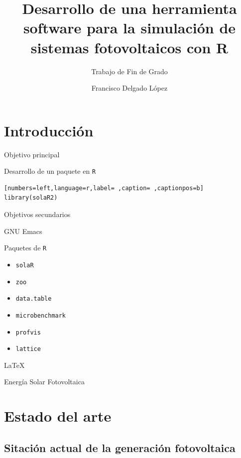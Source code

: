 \documentclass[aspectratio=169, usenames,svgnames,dvipsnames]{beamer}
\author{Francisco Delgado López}
\date{}
\title{Desarrollo de una herramienta software para la simulación de sistemas fotovoltaicos con R}
\subtitle{Trabajo de Fin de Grado}
\institute[UPM]{Universidad Politécnica de Madrid}
\begin{document}
\maketitle

\section{Introducción}
\label{sec:orgee55c55}
\begin{frame}[label={sec:orgb861117},fragile]{Objetivo principal}
 \begin{block}{Desarrollo de un paquete en \texttt{R}}
\begin{lstlisting}[numbers=left,language=r,label= ,caption= ,captionpos=b]
library(solaR2)
\end{lstlisting}
\end{block}
\end{frame}

\begin{frame}[label={sec:orgf639082},fragile]{Objetivos secundarios}
 \begin{block}{GNU Emacs}
\end{block}
\begin{block}{Paquetes de \texttt{R}}
\begin{itemize}
\item \texttt{solaR}
\item \texttt{zoo}
\item \texttt{data.table}
\item \texttt{microbenchmark}
\item \texttt{profvis}
\item \texttt{lattice}
\end{itemize}
\end{block}
\begin{block}{\LaTeX{}}
\end{block}
\begin{block}{Energía Solar Fotovoltaica}
\end{block}
\end{frame}

\section{Estado del arte}
\label{sec:org67dd343}
\subsection{Sitación actual de la generación fotovoltaica}
\label{sec:orgd75c9b4}
\end{document}

